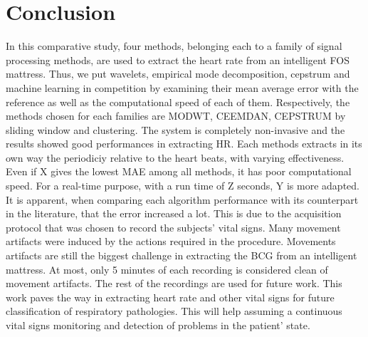 \documentclass[twoside,twocolumn]{article}
\begin{document}
\section{Conclusion}
In this comparative study, four methods, belonging each to a family of signal processing methods, are used to extract the heart rate from an intelligent FOS mattress. Thus, we put wavelets, empirical mode decomposition, cepstrum and machine learning in competition by examining their mean average error with the reference as well as the computational speed of each of them. Respectively, the methods chosen for each families are MODWT, CEEMDAN, CEPSTRUM by sliding window and clustering. The system is completely non-invasive and the results showed good performances in extracting HR. Each methods extracts in its own way the periodiciy relative to the heart beats, with varying effectiveness. Even if X gives the lowest MAE among all methods, it has poor computational speed. For a real-time purpose, with a run time of Z seconds, Y is more adapted. It is apparent, when comparing each algorithm performance with its counterpart in the literature, that the error increased a lot. This is due to the acquisition protocol that was chosen to record the subjects' vital signs. Many movement artifacts were induced by the actions required in the procedure. Movements artifacts are still the biggest challenge in extracting the BCG from an intelligent mattress. At most, only 5 minutes of each recording is considered clean of movement artifacts. The rest of the recordings are used for future work. This work paves the way in extracting heart rate and other vital signs for future classification of respiratory pathologies. This will help assuming a continuous vital signs monitoring and detection of problems in the patient' state.

\newpage



 
\end{document}
